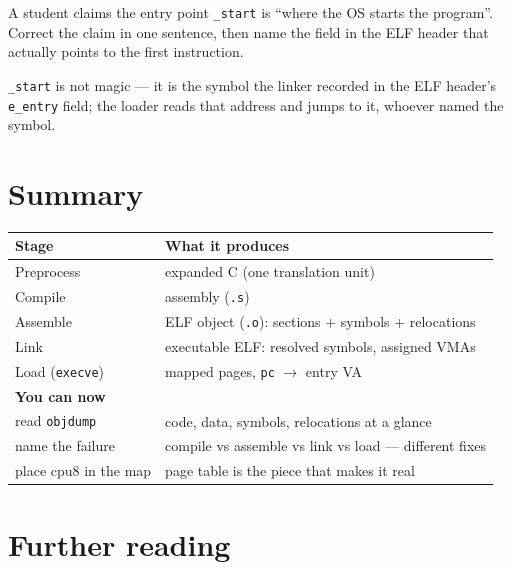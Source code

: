 \begin{exercise}[hard]\label{ex:hard03}
A student claims the entry point \texttt{\_start} is ``where the OS
starts the program''. Correct the claim in one sentence, then name
the field in the ELF header that actually points to the first
instruction.
\end{exercise}
\begin{solution}[hint]
\texttt{\_start} is not magic --- it is the symbol the linker recorded
in the ELF header's \texttt{e\_entry} field; the loader reads that
address and jumps to it, whoever named the symbol.
\end{solution}

\section*{Summary}
\label{sec:summary01}

\begin{center}
\begin{tabularx}{\linewidth}{lX}
\toprule
\textbf{Stage} & \textbf{What it produces} \\
\midrule
Preprocess & expanded C (one translation unit) \\
Compile & assembly (\texttt{.s}) \\
Assemble & ELF object (\texttt{.o}): sections + symbols + relocations \\
Link & executable ELF: resolved symbols, assigned VMAs \\
Load (\texttt{execve}) & mapped pages, \texttt{pc} $\to$ entry VA \\
\midrule
\textbf{You can now} & \\
\midrule
read \texttt{objdump} & code, data, symbols, relocations at a glance \\
name the failure & compile vs assemble vs link vs load --- different
fixes \\
place cpu8 in the map & page table is the piece that makes it real \\
\bottomrule
\end{tabularx}
\end{center}

\section*{Further reading}
\label{sec:fr01}

